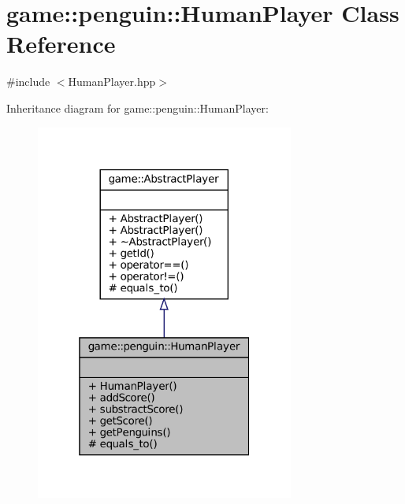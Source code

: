 \hypertarget{classgame_1_1penguin_1_1_human_player}{}\section{game\+:\+:penguin\+:\+:Human\+Player Class Reference}
\label{classgame_1_1penguin_1_1_human_player}


{\ttfamily \#include $<$Human\+Player.\+hpp$>$}



Inheritance diagram for game\+:\+:penguin\+:\+:Human\+Player\+:
\nopagebreak
\begin{figure}[H]
\begin{center}
\leavevmode
\includegraphics[width=241pt]{classgame_1_1penguin_1_1_human_player__inherit__graph}
\end{center}
\end{figure}


